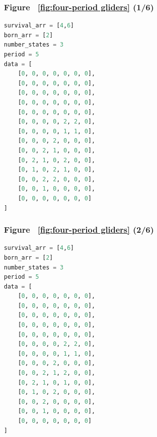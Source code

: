 \documentclass[12pt]{article}
\numberwithin{figure}{section} %
\begin{document}
\noindent\begin{minipage}{.45\textwidth}
\subsubsection{Figure ~\ref{fig:four-period gliders} (1/6)}
\label{subsubsection:four-period gliders(1/6)}
\begin{lstlisting}[language = Python]
survival_arr = [4,6]
born_arr = [2]
number_states = 3
period = 5
data = [
    [0, 0, 0, 0, 0, 0, 0],
    [0, 0, 0, 0, 0, 0, 0],
    [0, 0, 0, 0, 0, 0, 0],
    [0, 0, 0, 0, 0, 0, 0],
    [0, 0, 0, 0, 0, 0, 0],
    [0, 0, 0, 0, 2, 2, 0],
    [0, 0, 0, 0, 1, 1, 0],
    [0, 0, 0, 2, 0, 0, 0],
    [0, 0, 2, 1, 0, 0, 0],
    [0, 2, 1, 0, 2, 0, 0],
    [0, 1, 0, 2, 1, 0, 0],
    [0, 0, 2, 2, 0, 0, 0],
    [0, 0, 1, 0, 0, 0, 0],
    [0, 0, 0, 0, 0, 0, 0]
]

\end{lstlisting}
\end{minipage}\hfill
\begin{minipage}{.45\textwidth}
\subsubsection{Figure ~\ref{fig:four-period gliders} (2/6)}
\label{subsubsection:four-period gliders(2/6)}
\begin{lstlisting}[language = Python]
survival_arr = [4,6]
born_arr = [2]
number_states = 3
period = 5
data = [
    [0, 0, 0, 0, 0, 0, 0],
    [0, 0, 0, 0, 0, 0, 0],
    [0, 0, 0, 0, 0, 0, 0],
    [0, 0, 0, 0, 0, 0, 0],
    [0, 0, 0, 0, 0, 0, 0],
    [0, 0, 0, 0, 2, 2, 0],
    [0, 0, 0, 0, 1, 1, 0],
    [0, 0, 0, 2, 0, 0, 0],
    [0, 0, 2, 1, 2, 0, 0],
    [0, 2, 1, 0, 1, 0, 0],
    [0, 1, 0, 2, 0, 0, 0],
    [0, 0, 2, 0, 0, 0, 0],
    [0, 0, 1, 0, 0, 0, 0],
    [0, 0, 0, 0, 0, 0, 0]
]
\end{lstlisting}
\end{minipage}
\end{document}

